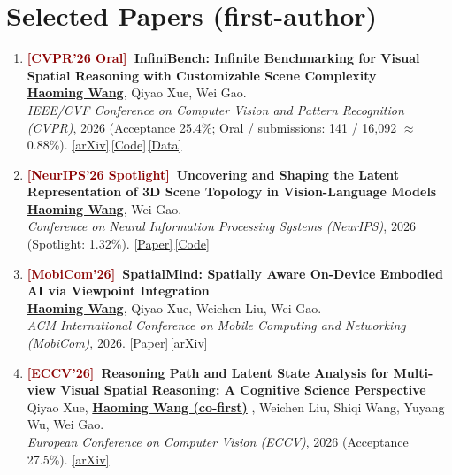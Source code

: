 \documentclass[11pt, letterpaper]{article}
\newenvironment{publist}{
  \begin{enumerate}[leftmargin=1.7em, itemsep=4pt, parsep=0pt, topsep=2pt,
                    label=\arabic*., ref=\arabic*, series=pubs]
}{\end{enumerate}}
\newcommand{\me}{\underline{\textbf{Haoming Wang}}}
\newcommand{\meco}{\underline{\textbf{Haoming Wang (co-first)}} }
\begin{document}
\section{Selected Papers (first-author)}

\begin{publist}
\item\label{pub:infinibench} \textbf{\textcolor{darkred}{[CVPR'26 Oral]}\ InfiniBench: Infinite Benchmarking for Visual Spatial Reasoning with Customizable Scene Complexity}\\
\me, Qiyao Xue, Wei Gao.\\
\textit{IEEE/CVF Conference on Computer Vision and Pattern Recognition (CVPR)}, 2026 (Acceptance 25.4\%; Oral / submissions: 141 / 16,092 $\approx$ 0.88\%). \href{https://arxiv.org/abs/2511.18200}{[arXiv]}\,\href{https://github.com/pittisl/infinibench}{[Code]}\,\href{https://huggingface.co/datasets/Haoming645/infinibench}{[Data]}


\item\label{pub:vlmlatent} \textbf{\textcolor{darkred}{[NeurIPS'26 Spotlight]}\ Uncovering and Shaping the Latent Representation of 3D Scene Topology in Vision-Language Models}\\
\me, Wei Gao.\\
\textit{Conference on Neural Information Processing Systems (NeurIPS)}, 2026 (Spotlight: 1.32\%). \href{https://haomingwang645.github.io/pdfs/arxiv26_vlm_latent_shaping.pdf}{[Paper]}\,\href{https://github.com/pittisl/vlm-latent-shaping}{[Code]}

\item\label{pub:mosaic} \textbf{\textcolor{darkred}{[MobiCom'26]}\ SpatialMind: Spatially Aware On-Device Embodied AI via Viewpoint Integration}\\
\me, Qiyao Xue, Weichen Liu, Wei Gao.\\
\textit{ACM International Conference on Mobile Computing and Networking (MobiCom)}, 2026. \href{https://mobicom26.hotcrp.com/paper/1215}{[Paper]}\,\href{https://www.arxiv.org/abs/2602.07082}{[arXiv]}

\item\label{pub:remindview} \textbf{\textcolor{darkred}{[ECCV'26]}\ Reasoning Path and Latent State Analysis for Multi-view Visual Spatial Reasoning: A Cognitive Science Perspective}\\
Qiyao Xue, \meco, Weichen Liu, Shiqi Wang, Yuyang Wu, Wei Gao.\\
\textit{European Conference on Computer Vision (ECCV)}, 2026 (Acceptance 27.5\%). \href{https://arxiv.org/abs/2512.02340}{[arXiv]}


\end{publist}
\end{document}
